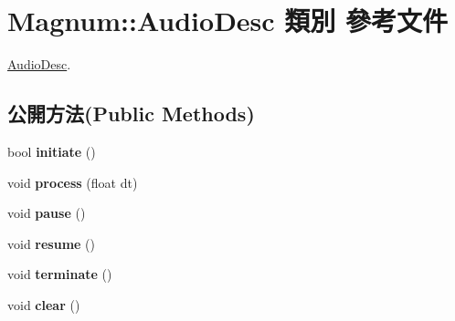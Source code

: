 \hypertarget{class_magnum_1_1_audio_desc}{}\section{Magnum\+:\+:Audio\+Desc 類別 參考文件}
\label{class_magnum_1_1_audio_desc}


\hyperlink{class_magnum_1_1_audio_desc}{Audio\+Desc}.  


\subsection*{公開方法(Public Methods)}
\begin{DoxyCompactItemize}
\item 
bool {\bfseries initiate} ()\hypertarget{class_magnum_1_1_audio_desc_ae705aa8e36d46a200a72f0a75fa7088c}{}\label{class_magnum_1_1_audio_desc_ae705aa8e36d46a200a72f0a75fa7088c}

\item 
void {\bfseries process} (float dt)\hypertarget{class_magnum_1_1_audio_desc_a7c49f7364658de86d61e7d2089627d06}{}\label{class_magnum_1_1_audio_desc_a7c49f7364658de86d61e7d2089627d06}

\item 
void {\bfseries pause} ()\hypertarget{class_magnum_1_1_audio_desc_ae013d0e047a4c4070f50edb91d51e55f}{}\label{class_magnum_1_1_audio_desc_ae013d0e047a4c4070f50edb91d51e55f}

\item 
void {\bfseries resume} ()\hypertarget{class_magnum_1_1_audio_desc_a1e680634fcae7fc59ccc2b3f3495684e}{}\label{class_magnum_1_1_audio_desc_a1e680634fcae7fc59ccc2b3f3495684e}

\item 
void {\bfseries terminate} ()\hypertarget{class_magnum_1_1_audio_desc_a0c259e9fb45f7736a653ff06ceee755a}{}\label{class_magnum_1_1_audio_desc_a0c259e9fb45f7736a653ff06ceee755a}

\item 
void {\bfseries clear} ()\hypertarget{class_magnum_1_1_audio_desc_a9c77a781e4ca0865e778871a6dc2486d}{}\label{class_magnum_1_1_audio_desc_a9c77a781e4ca0865e778871a6dc2486d}

\end{DoxyCompactItemize}
